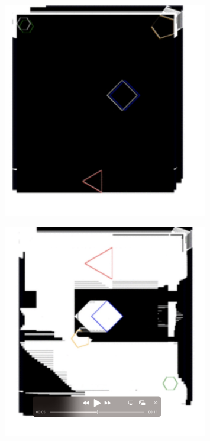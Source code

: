 \documentclass[12pt]{book}
\begin{document}
\begin{figure}
    \centering
    \includegraphics[width=0.8\textwidth]{rendering/figures/s3.png}
\end{figure}
\begin{figure}
    \centering
    \includegraphics[width=0.8\textwidth]{rendering/figures/s4.png}
\end{figure}
\end{document}
